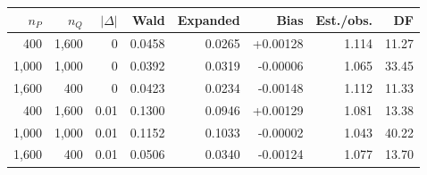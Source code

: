 \begin{tabular}{@{}rrrrrrrr@{}}\toprule
\(n_P\) & \(n_Q\) & \(|\Delta|\) & Wald & Expanded & Bias & Est./obs. & DF\\\midrule
400 & 1,600 & 0 & 0.0458 & 0.0265 & +0.00128 & 1.114 & 11.27\\
1,000 & 1,000 & 0 & 0.0392 & 0.0319 & -0.00006 & 1.065 & 33.45\\
1,600 & 400 & 0 & 0.0423 & 0.0234 & -0.00148 & 1.112 & 11.33\\
400 & 1,600 & 0.01 & 0.1300 & 0.0946 & +0.00129 & 1.081 & 13.38\\
1,000 & 1,000 & 0.01 & 0.1152 & 0.1033 & -0.00002 & 1.043 & 40.22\\
1,600 & 400 & 0.01 & 0.0506 & 0.0340 & -0.00124 & 1.077 & 13.70\\
\bottomrule\end{tabular}
